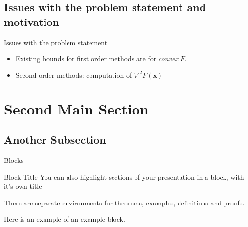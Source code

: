 \documentclass{beamer}
\begin{document}
\subsection{Issues with the problem statement and motivation}

\begin{frame}{Issues with the problem statement}
  \begin{itemize}
  \item {
    Existing bounds for first order methods are for \emph{convex} \(F\).
    \begin{itemize}
    \end{itemize}
  }

  \item<4-> {
    Second order methods: computation of \(\nabla^{2} F(\mathbf{x})\)
    \begin{itemize}
    \end{itemize}
  }
  \end{itemize}

\end{frame}

\section{Second Main Section}

\subsection{Another Subsection}

\begin{frame}{Blocks}
\begin{block}{Block Title}
You can also highlight sections of your presentation in a block, with it's own title
\end{block}
\begin{theorem}
There are separate environments for theorems, examples, definitions and proofs.
\end{theorem}
\begin{example}
Here is an example of an example block.
\end{example}
\end{frame}
\end{document}

